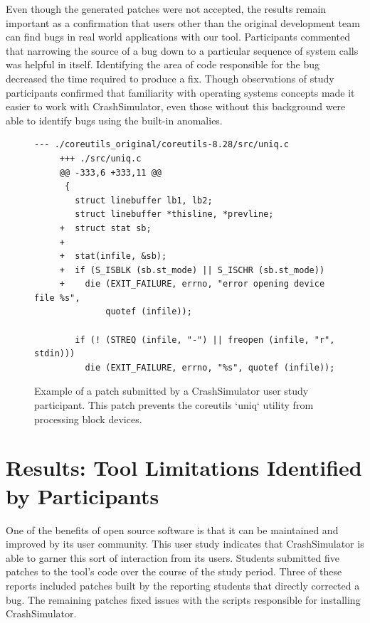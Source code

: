 Even though the generated patches were not accepted,
the results remain
important as a confirmation that 
users other than the original development team
can find bugs in real world applications with our tool.
Participants commented that narrowing the source of a bug
down to a particular sequence of system calls
was helpful in itself. Identifying the area of
code responsible for the bug decreased the time required to produce a fix.
Though observations of study participants
confirmed that familiarity with operating systems concepts
made it easier to work with CrashSimulator, even
those without this background were able to identify bugs using the
built-in anomalies.


 \begin{figure}
 \begin{lstlisting}[basicstyle=\ttfamily,gobble=4]
     --- ./coreutils_original/coreutils-8.28/src/uniq.c
     +++ ./src/uniq.c
     @@ -333,6 +333,11 @@
      {
        struct linebuffer lb1, lb2;
        struct linebuffer *thisline, *prevline;
     +  struct stat sb;
     +
     +  stat(infile, &sb);
     +  if (S_ISBLK (sb.st_mode) || S_ISCHR (sb.st_mode))
     +    die (EXIT_FAILURE, errno, "error opening device file %s",
              quotef (infile));

        if (! (STREQ (infile, "-") || freopen (infile, "r", stdin)))
          die (EXIT_FAILURE, errno, "%s", quotef (infile));
\end{lstlisting}
\caption[Participant Submitted Patch]{Example of a patch submitted by a CrashSimulator user study participant.
This patch prevents the coreutils `uniq` utility from processing block devices. }
\label{fig:participantpatch}
\end{figure}

\section{Results: Tool Limitations Identified by Participants}
\label{subsec:crashsim-patches}

One of the benefits of open source software is that it can be maintained and improved by its user community.
This user study indicates that CrashSimulator is able to garner this sort of interaction from its users.
Students submitted five patches
to the tool's code over the
course of the study period.
Three of these reports included patches built by the reporting students that directly
corrected a bug.
The remaining patches fixed issues with the scripts responsible for installing CrashSimulator.

